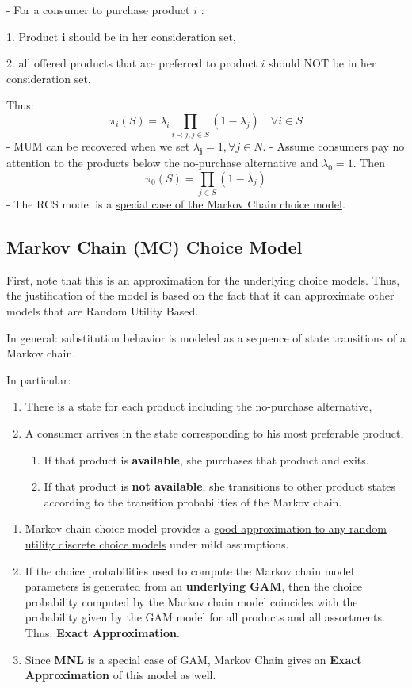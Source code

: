 \documentclass[11pt]{elegantbook}
\begin{document}
- For a consumer to purchase product $i$ :

1. Product $\mathbf{i}$ should be in her consideration set,

2. all offered products that are preferred to product $i$ should NOT be in her consideration set.

Thus:
$$
\pi_{i}(S)=\lambda_{i} \prod_{i \prec j, j \in S}\left(1-\lambda_{j}\right) \quad \forall i \in S
$$
- MUM can be recovered when we set $\lambda_{\mathbf{j}}=1, \forall j \in N$.
- Assume consumers pay no attention to the products below the no-purchase alternative and $\lambda_{0}=1$. Then
$$
\pi_{0}(S)=\prod_{j \in S}\left(1-\lambda_{j}\right)
$$
- The RCS model is a \underline{special case of the Markov Chain choice model}.


\subsection{Markov Chain (MC) Choice Model}
First, note that this is an approximation for the underlying choice models.
Thus, the justification of the model is based on the fact that it can approximate other models that are Random Utility Based.

In general: substitution behavior is modeled as a sequence of state transitions of a Markov chain.

In particular:
\begin{enumerate}[(1)]
    \item There is a state for each product including the no-purchase alternative,
    \item A consumer arrives in the state corresponding to his most preferable product,
    \begin{enumerate}[$\bullet$]
        \item If that product is \textbf{available}, she purchases that product and exits.
        \item If that product is \textbf{not available}, she transitions to other product states according to the transition probabilities of the Markov chain.
    \end{enumerate}
\end{enumerate}

\begin{enumerate}[$\bullet$]
    \item Markov chain choice model provides a \underline{good approximation to any random utility discrete choice models} under mild assumptions.
    \item If the choice probabilities used to compute the Markov chain model parameters is generated from an \textbf{underlying GAM}, then the choice probability computed by the Markov chain model coincides with the probability given by the GAM model for all products and all assortments. Thus: \textbf{Exact Approximation}.
    \item Since \textbf{MNL} is a special case of GAM, Markov Chain gives an \textbf{Exact Approximation} of this model as well.
\end{enumerate}
\end{document}
